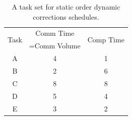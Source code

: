 \documentclass[sigconf]{acmart}
\begin{document}
\begin{table}[htb]
	\begin{center}
		
		\begin{tabular}{|c|c|c|}
			\hline
			\multirow{2}{*}{Task} & Comm Time & \multirow{2}{*}{Comp Time}\\ 
			&=Comm Volume& \\ \hline
			A & 4 & 1\\ \hline
			B & 2 & 6\\ \hline
			C & 8 & 8\\ \hline
			D & 5 & 4\\ \hline
			E & 3 & 2\\ \hline
		\end{tabular}
		\caption{\label{tab:staticOrderDynamicCorrectionsExample} A task set for static order dynamic corrections schedules.}
	\end{center}
\end{table}
\end{document}
